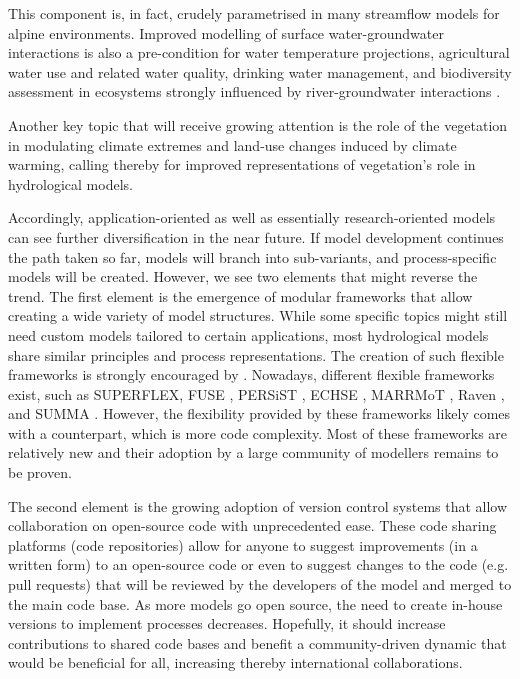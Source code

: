 \documentclass[10pt,a4paper]{article}
\begin{document}
This component is, in fact, crudely parametrised in many streamflow models for alpine environments. Improved modelling of surface water-groundwater interactions is also a pre-condition for water temperature projections, agricultural water use and related water quality, drinking water management, and biodiversity assessment in ecosystems strongly influenced by river-groundwater interactions \citep{Brunner_2017}. 

Another key topic that will receive growing attention is the role of the vegetation in modulating climate extremes \citep{Mastrotheodoros_2020} and land-use changes induced by climate warming, calling thereby for improved representations of vegetation's role in hydrological models.

Accordingly, application-oriented as well as essentially research-oriented models can see further diversification in the near future. If model development continues the path taken so far, models will branch into sub-variants, and process-specific models will be created. However, we see two elements that might reverse the trend. The first element is the emergence of modular frameworks that allow creating a wide variety of model structures. While some specific topics might still need custom models tailored to certain applications, most hydrological models share similar principles and process representations. The creation of such flexible frameworks is strongly encouraged by \citet{Clark2011a}. Nowadays, different flexible frameworks exist, such as SUPERFLEX, FUSE \citep{Clark2008}, PERSiST \citep{Futter2014}, ECHSE \citep{Kneis2015}, MARRMoT \citep{Knoben2019}, Raven \citep{Craig2020}, and SUMMA \citep{Clark2015}. {However, the flexibility provided by these frameworks likely comes with a counterpart, which is more code complexity. Most of these frameworks are relatively new and their adoption by a large community of modellers remains to be proven}.

The second element is the growing adoption of version control systems that allow collaboration on open-source code with unprecedented ease. These code sharing platforms (code repositories) allow for anyone to suggest improvements (in a written form) to an open-source code or even to suggest changes to the code (e.g. pull requests) that will be reviewed by the developers of the model and merged to the main code base. As more models go open source, the need to create in-house versions to implement processes decreases. Hopefully, it should increase contributions to shared code bases and benefit a community-driven dynamic that would be beneficial for all, increasing thereby international collaborations.
\end{document}
